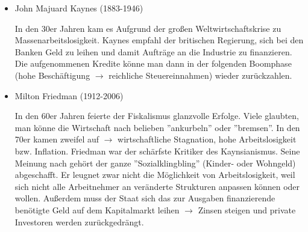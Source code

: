 \documentclass[a4paper]{report}
\begin{document}
\begin{itemize}
\item John Majuard Kaynes (1883-1946)

In den 30er Jahren kam es Aufgrund der großen Weltwirtschaftskrise zu Massenarbeitslosigkeit. Kaynes empfahl der britischen Regierung, sich bei den Banken Geld zu leihen und damit Aufträge an die Industrie zu finanzieren. Die aufgenommenen Kredite könne man dann in der folgenden Boomphase (hohe Beschäftigung $\rightarrow$ reichliche Steuereinnahmen) wieder zurückzahlen.

\item Milton Friedman (1912-2006)

In den 60er Jahren feierte der Fiskalismus glanzvolle Erfolge. Viele glaubten, man könne die Wirtschaft nach belieben ''ankurbeln'' oder ''bremsen''. In den 70er kamen zweifel auf $\rightarrow$ wirtschaftliche Stagnation, hohe Arbeitslosigkeit bzw. Inflation. Friedman war der schärfste Kritiker des Kaynsianismus. Seine Meinung nach gehört der ganze ''Sozialklingbling'' (Kinder- oder Wohngeld) abgeschafft. Er leugnet zwar nicht die Möglichkeit von Arbeitslosigkeit, weil sich nicht alle Arbeitnehmer an veränderte Strukturen anpassen können oder wollen. Außerdem muss der Staat sich das zur Ausgaben finanzierende benötigte Geld auf dem Kapitalmarkt leihen $\rightarrow$ Zinsen steigen und private Investoren werden zurückgedrängt.
\end{itemize}
\end{document}

